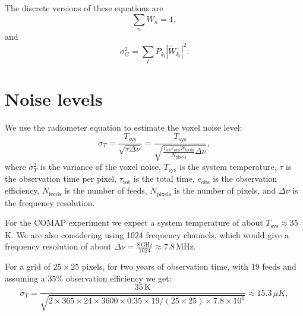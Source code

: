 \documentclass[a4paper,10pt]{article}
\begin{document}
The discrete versions of these equations are 
\begin{equation}
 \sum_n W_{n} = 1,
\end{equation}
and 
\begin{equation}
 \sigma_G^2 = \sum_l P_{k_l} |\tilde{W}_{k_l}|^2 .
\end{equation}

\section{Noise levels}
We use the radiometer equation to estimate the voxel noise level: 
\begin{equation}
 \sigma_T = \frac{T_\text{sys}}{\sqrt{\tau \Delta \nu}} = \frac{T_\text{sys}}{\sqrt{\frac{\tau_\text{tot} e_\text{obs} N_\text{feeds}}{N_\text{pixels}} \Delta \nu}},
\end{equation}
where $\sigma_T^2$ is the variance of the voxel noise, $T_\text{sys}$ is the system temperature, $\tau$ is the observation time per pixel, $\tau_\text{tot}$ is the total time, $e_\text{obs}$ is the observation efficiency, $N_\text{feeds}$ is the number of feeds, $N_\text{pixels}$ is the number of pixels, and $\Delta \nu$ is the frequency resolution.

For the COMAP experiment we expect a system temperature of about $T_\text{sys} \approx 35$ K. We are also considering using 1024 frequency channels, which would give a frequency resolution of about $\Delta \nu = \frac{8\, \text{GHz}}{1024} \approx 7.8\, \text{MHz}$. 

For a grid of $25 \times 25$ pixels, for two years of observation time, with 19 feeds and assuming a $35 \%$ observation efficiency we get: 
\begin{equation}
 \sigma_T = \frac{35\, \text{K}}{\sqrt{2 \times 365 \times 24 \times 3600 \times 0.35 \times 19 / (25 \times 25) \times 7.8 \times 10^6}} \approx 15.3 \, \mu K,
\end{equation}
\end{document}
